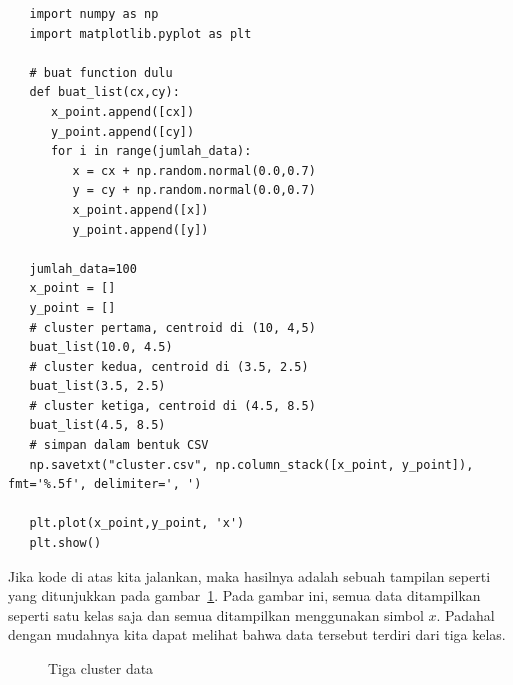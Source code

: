\begin{verbatim}
   import numpy as np
   import matplotlib.pyplot as plt
   
   # buat function dulu
   def buat_list(cx,cy):
      x_point.append([cx])
      y_point.append([cy])
      for i in range(jumlah_data):
         x = cx + np.random.normal(0.0,0.7)
         y = cy + np.random.normal(0.0,0.7)
         x_point.append([x])
         y_point.append([y])
   
   jumlah_data=100
   x_point = []
   y_point = []
   # cluster pertama, centroid di (10, 4,5)
   buat_list(10.0, 4.5)
   # cluster kedua, centroid di (3.5, 2.5)
   buat_list(3.5, 2.5)
   # cluster ketiga, centroid di (4.5, 8.5)
   buat_list(4.5, 8.5)
   # simpan dalam bentuk CSV
   np.savetxt("cluster.csv", np.column_stack([x_point, y_point]), fmt='%.5f', delimiter=', ')
   
   plt.plot(x_point,y_point, 'x')
   plt.show()
\end{verbatim}

Jika kode di atas kita jalankan, maka hasilnya adalah sebuah tampilan
seperti yang ditunjukkan pada gambar~\ref{fig:clustercreate}.
Pada gambar ini, semua data ditampilkan seperti satu kelas saja dan
semua ditampilkan menggunakan simbol $x$. Padahal dengan mudahnya kita
dapat melihat bahwa data tersebut terdiri dari tiga kelas.

\begin{figure}[ht]
   \caption{Tiga cluster data}
   \label{fig:clustercreate}
\end{figure}

